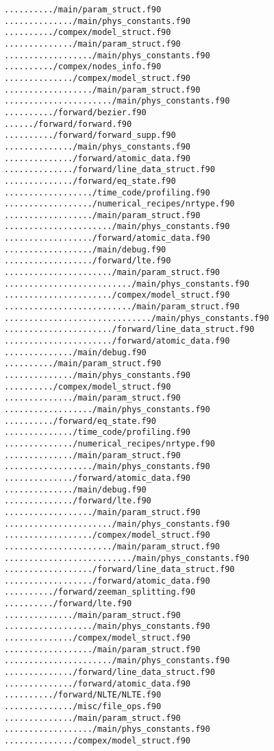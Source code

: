 \begin{verbatim}
........../main/param_struct.f90
............../main/phys_constants.f90
........../compex/model_struct.f90
............../main/param_struct.f90
................../main/phys_constants.f90
........../compex/nodes_info.f90
............../compex/model_struct.f90
................../main/param_struct.f90
....................../main/phys_constants.f90
........../forward/bezier.f90
....../forward/forward.f90
........../forward/forward_supp.f90
............../main/phys_constants.f90
............../forward/atomic_data.f90
............../forward/line_data_struct.f90
............../forward/eq_state.f90
................../time_code/profiling.f90
................../numerical_recipes/nrtype.f90
................../main/param_struct.f90
....................../main/phys_constants.f90
................../forward/atomic_data.f90
................../main/debug.f90
................../forward/lte.f90
....................../main/param_struct.f90
........................../main/phys_constants.f90
....................../compex/model_struct.f90
........................../main/param_struct.f90
............................../main/phys_constants.f90
....................../forward/line_data_struct.f90
....................../forward/atomic_data.f90
............../main/debug.f90
........../main/param_struct.f90
............../main/phys_constants.f90
........../compex/model_struct.f90
............../main/param_struct.f90
................../main/phys_constants.f90
........../forward/eq_state.f90
............../time_code/profiling.f90
............../numerical_recipes/nrtype.f90
............../main/param_struct.f90
................../main/phys_constants.f90
............../forward/atomic_data.f90
............../main/debug.f90
............../forward/lte.f90
................../main/param_struct.f90
....................../main/phys_constants.f90
................../compex/model_struct.f90
....................../main/param_struct.f90
........................../main/phys_constants.f90
................../forward/line_data_struct.f90
................../forward/atomic_data.f90
........../forward/zeeman_splitting.f90
........../forward/lte.f90
............../main/param_struct.f90
................../main/phys_constants.f90
............../compex/model_struct.f90
................../main/param_struct.f90
....................../main/phys_constants.f90
............../forward/line_data_struct.f90
............../forward/atomic_data.f90
........../forward/NLTE/NLTE.f90
............../misc/file_ops.f90
............../main/param_struct.f90
................../main/phys_constants.f90
............../compex/model_struct.f90

\end{verbatim}
